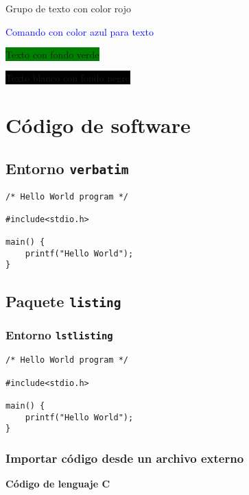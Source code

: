 \documentclass{article}
\begin{document}
{\color{red} Grupo de texto con color rojo}

\textcolor{blue}{Comando con color azul para texto}

\colorbox{green}{Texto con fondo verde}

\colorbox{black}{\color{white} Texto blanco con fondo negro}



\section{Código de software}

\subsection{Entorno \texttt{verbatim}}

\begin{verbatim}
/* Hello World program */

#include<stdio.h>

main() {
    printf("Hello World");
}
\end{verbatim}

\subsection{Paquete \texttt{listing}}

\subsubsection{Entorno \texttt{lstlisting}}

\begin{lstlisting}[caption={Código C},label={lst:codigoc}]
/* Hello World program */

#include<stdio.h>

main() {
    printf("Hello World");
}
\end{lstlisting}

\subsubsection{Importar código desde un archivo externo}

\textbf{Código de lenguaje C}


\end{document}
